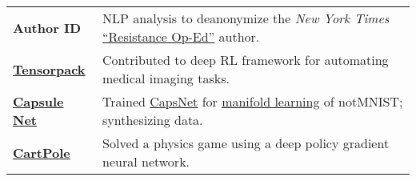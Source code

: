 \documentclass[a4paper,12pt]{article}
\begin{document}
      \begin{tabularx}{\textwidth}{p{3cm}>{\arraybackslash}X}  %



      \bfseries{Author ID} & NLP analysis to deanonymize the \textit{New York Times} \href{https://www.nytimes.com/2018/09/05/opinion/trump-white-house-anonymous-resistance.html}{``Resistance Op-Ed''} author.\\

      \bfseries{\href{https://github.com/amiralansary/tensorpack-medical}{Tensorpack}} & Contributed to deep RL framework for automating medical imaging tasks.\\






	\bfseries{\href{https://github.com/crypdick/CapsNet-Keras-notMNIST}{Capsule Net}} & Trained \href{https://arxiv.org/abs/1710.09829}{CapsNet} for \href{https://en.wikipedia.org/wiki/Nonlinear_dimensionality_reduction}{manifold learning} of notMNIST; synthesizing data.\\

      \bfseries{\href{https://github.com/crypdick/policy-gradients-cartpole/blob/master/capstone_report.pdf}{CartPole}} &  Solved a physics game using a deep policy gradient neural network.\\

      \end{tabularx}
\end{document}
